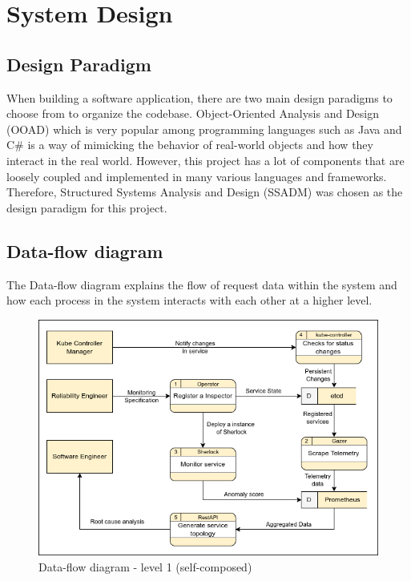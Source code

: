 \section{System Design}

\subsection{Design Paradigm}

When building a software application, there are two main design paradigms to choose from to organize the codebase. Object-Oriented Analysis and Design (OOAD) which is very popular among programming languages such as Java and C\# is a way of mimicking the behavior of real-world objects and how they interact in the real world. However, this project has a lot of components that are loosely coupled and implemented in many various languages and frameworks. Therefore, Structured Systems Analysis and Design (SSADM) was chosen as the design paradigm for this project.

\subsection{Data-flow diagram}

The Data-flow diagram explains the flow of request data within the system and how each process in the system interacts with each other at a higher level.

\begin{figure}[H]
    \includegraphics[width=12cm]{assets/system-design/data-flow-level-1.png}
    \caption{Data-flow diagram - level 1 (self-composed)}
\end{figure}

